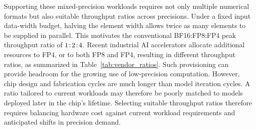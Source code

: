 \documentclass[conference,10pt,letterpaper]{IEEEtran}
\DeclareRobustCommand{\tpratio}[3]{\ensuremath{#1\mkern2mu{:}\mkern2mu#2\mkern2mu{:}\mkern2mu#3}}
\begin{document}
Supporting these mixed-precision workloads requires not only multiple numerical formats but also suitable throughput ratios across precisions. Under a fixed input data-width budget, halving the element width allows twice as many elements to be supplied in parallel. This motivates the conventional BF16:FP8:FP4 peak throughput ratio of \tpratio{1}{2}{4}. Recent industrial AI accelerators allocate additional resources to FP4, or to both FP8 and FP4, resulting in different throughput ratios, as summarized in Table~\ref{tab:vendor_ratios}. Such provisioning can provide headroom for the growing use of low-precision computation. However, chip design and fabrication cycles are much longer than model iteration cycles. A ratio tailored to current workloads may therefore be poorly matched to models deployed later in the chip's lifetime. Selecting suitable throughput ratios therefore requires balancing hardware cost against current workload requirements and anticipated shifts in precision demand.
\end{document}
